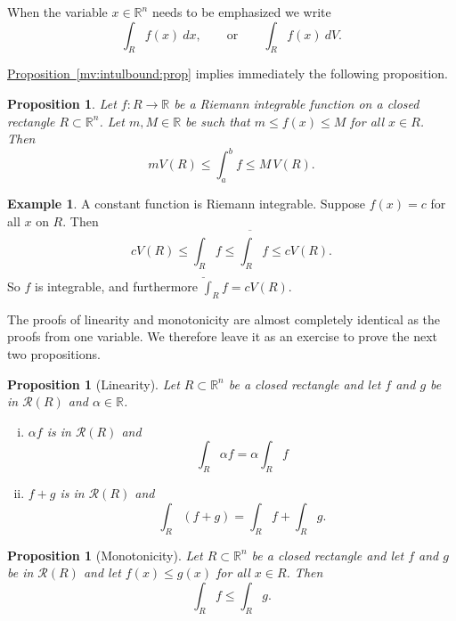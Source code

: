 \documentclass[12pt]{book}
\newcommand{\R}{{\mathbb{R}}}
\newcommand{\sR}{{\mathcal{R}}}
\theoremstyle{plain}
\newtheorem{prop}[thm]{Proposition}
\theoremstyle{remark}
\theoremstyle{definition}
\theoremstyle{exercise}
\theoremstyle{example}
\newtheorem{example}[thm]{Example}
\newcommand{\propref}[1]{\hyperref[#1]{Proposition~\ref*{#1}}}
\begin{document}
When the variable $x \in \R^n$ needs to be emphasized we write
\begin{equation*}
\int_R f(x)~dx,
\qquad
\text{or}
\qquad
\int_R f(x)~dV .
\end{equation*}

\propref{mv:intulbound:prop} implies immediately the following
proposition.

\begin{prop} \label{mv:intbound:prop}
Let $f \colon R \to \R$ be a Riemann integrable function
on a closed rectangle $R \subset \R^n$.
Let $m, M \in \R$ be 
such that $m \leq f(x) \leq M$ for all $x \in R$.  Then
\begin{equation*}
m V(R) \leq
\int_a^b f
\leq M \, V(R) .
\end{equation*}
\end{prop}

\begin{example}
A constant function is Riemann integrable.  Suppose
$f(x) = c$ for all $x$ on $R$.  Then
\begin{equation*}
c V(R) \leq \underline{\int_R} f \leq \overline{\int_R} f \leq cV(R) .
\end{equation*}
So $f$ is integrable, and furthermore $\int_R f = cV(R)$.
\end{example}

The proofs of linearity and monotonicity are almost completely identical as
the proofs from one variable.  We therefore leave it as an exercise to prove
the next two propositions.

\begin{prop}[Linearity] \label{mv:intlinearity:prop}
Let $R \subset \R^n$ be a closed rectangle and let
$f$ and $g$ be in $\sR(R)$ and $\alpha \in \R$.
\begin{enumerate}[(i)]
\item $\alpha f$ is in $\sR(R)$ and
\begin{equation*}
\int_R \alpha f = \alpha \int_R f
\end{equation*}
\item $f+g$ is in $\sR(R)$ and
\begin{equation*}
\int_R (f+g) = 
\int_R f
+
\int_R g .
\end{equation*}
\end{enumerate}
\end{prop}

\begin{prop}[Monotonicity]
Let $R \subset \R^n$ be a closed rectangle and let
$f$ and $g$ be in $\sR(R)$ and let $f(x) \leq g(x)$
for all $x \in R$.  Then
\begin{equation*}
\int_R f 
\leq
\int_R g .
\end{equation*}
\end{prop}
\end{document}

